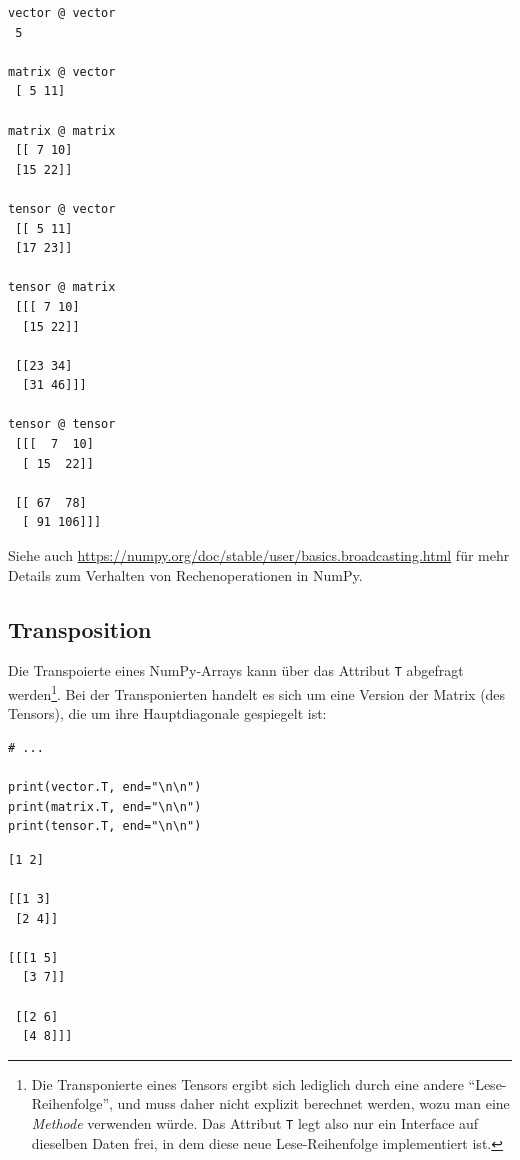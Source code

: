 \begin{cmdbox}
\begin{verbatim}
vector @ vector
 5

matrix @ vector
 [ 5 11]

matrix @ matrix
 [[ 7 10]
 [15 22]]

tensor @ vector
 [[ 5 11]
 [17 23]]
 
tensor @ matrix
 [[[ 7 10]
  [15 22]]

 [[23 34]
  [31 46]]]

tensor @ tensor
 [[[  7  10]
  [ 15  22]]

 [[ 67  78]
  [ 91 106]]]
\end{verbatim}
\end{cmdbox}

Siehe auch \url{https://numpy.org/doc/stable/user/basics.broadcasting.html} für mehr Details zum Verhalten von Rechenoperationen in NumPy.

\subsection{Transposition}
Die Transpoierte eines NumPy-Arrays kann über das Attribut \texttt{T} abgefragt werden\footnote{Die Transponierte eines Tensors ergibt sich lediglich durch eine andere \enquote{Lese-Reihenfolge}, und muss daher nicht explizit berechnet werden, wozu man eine \emph{Methode} verwenden würde. Das Attribut \texttt{T} legt also nur ein Interface auf dieselben Daten frei, in dem diese neue Lese-Reihenfolge implementiert ist.}. Bei der Transponierten handelt es sich um eine Version der Matrix (des Tensors), die um ihre Hauptdiagonale gespiegelt ist:

\begin{tcbraster}[raster columns=2,
                  raster equal height,
                  nobeforeafter,
                  raster column skip=0.5cm]
\begin{codebox}
\begin{verbatim}
# ...

print(vector.T, end="\n\n")
print(matrix.T, end="\n\n")
print(tensor.T, end="\n\n")
\end{verbatim}
\end{codebox}
%
\begin{cmdbox}
\begin{verbatim}
[1 2]

[[1 3]
 [2 4]]
 
[[[1 5]
  [3 7]]

 [[2 6]
  [4 8]]]
\end{verbatim}
\end{cmdbox}
\end{tcbraster}

